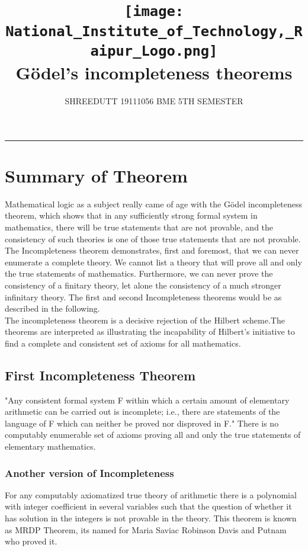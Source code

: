 \documentclass[13pt,letterpaper]{article}
\begin{document}
\title{
\texttt{[image: National\_Institute\_of\_Technology,\_Raipur\_Logo.png]}
\\ 
Gödel's incompleteness theorems
}

\author{SHREEDUTT 19111056 BME 5TH SEMESTER}

\maketitle
\rule{\textwidth}{0.5pt}
\nolinebreak[4]
\section*{Summary of Theorem}
Mathematical logic as a subject really came of age with the Gödel incompleteness theorem, which shows that in any sufficiently strong formal system in mathematics, there will be true statements that are not provable, and the consistency of such theories is one of those true statements that are not provable.
\\
The Incompleteness theorem demonstrates, first and foremost, that we can never enumerate a complete theory. We cannot list a theory that will prove all and only the true statements of mathematics. Furthermore, we can never prove the consistency of a finitary theory, let alone the consistency of a much stronger infinitary theory. The first and second Incompleteness theorems would be as described in the following.
\\
The incompleteness theorem is a decisive rejection of the Hilbert scheme.The theorems are interpreted as illustrating the incapability of Hilbert's initiative to find a complete and consistent set of axioms for all mathematics.
\\
\subsection* {First Incompleteness Theorem} "Any consistent formal system F within which a certain amount of elementary arithmetic can be carried out is incomplete; i.e., there are statements of the language of F which can neither be proved nor disproved in F."
There is no computably enumerable set of axioms proving all and only the true statements of elementary mathematics.
\\
\subsubsection* {Another version of Incompleteness}
For any computably axiomatized true theory of arithmetic there is  a polynomial with integer coefficient in several variables such that the question  of  whether it has solution in the integers is not provable in the theory.
This theorem is known as MRDP Theorem, its named for Maria Saviac Robinson Davis and Putnam who proved it. 
\end{document}
